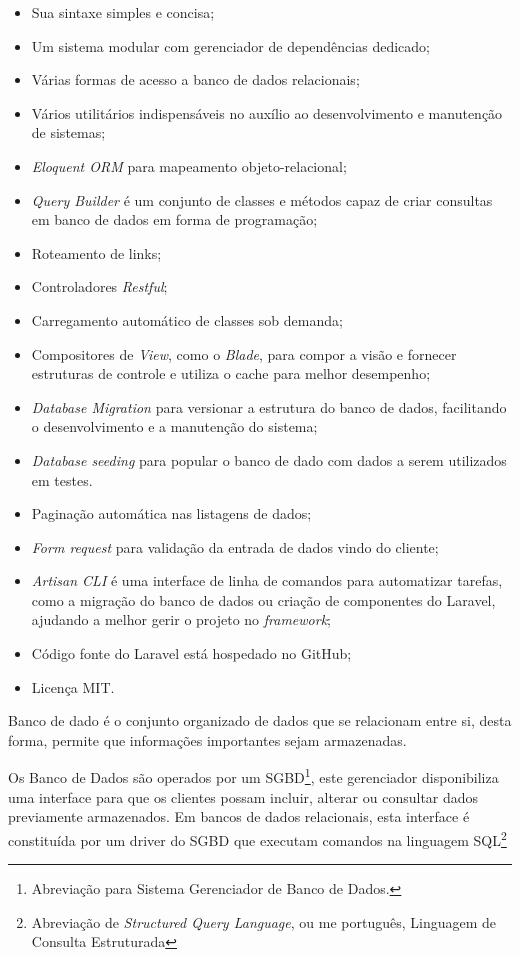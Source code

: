 \documentclass[
  12pt,				%
  openany,
  oneside,
  a4paper,			%
  english,			%
  brazil
]{article}
\numberwithin{figure}{section}
\numberwithin{table}{section}
\newcounter{subsubsubsection}[subsubsection]
\begin{document}
{\singlespacing
\begin{itemize}
  \item Sua sintaxe simples e concisa;
  \item Um sistema modular com gerenciador de dependências dedicado;
  \item Várias formas de acesso a banco de dados relacionais;
  \item Vários utilitários indispensáveis no auxílio ao desenvolvimento e manutenção de sistemas;
  \item \textit{Eloquent ORM} para mapeamento objeto-relacional;
  \item \textit{Query Builder} é um conjunto de classes e métodos capaz de criar consultas em banco de dados em forma de programação;
  \item Roteamento de links;
  \item Controladores \textit{Restful};
  \item Carregamento automático de classes sob demanda;
  \item Compositores de \textit{View}, como o \textit{Blade}, para compor a visão e fornecer estruturas de controle e utiliza o cache para melhor desempenho;
  \item \textit{Database Migration} para versionar a estrutura do banco de dados, facilitando o desenvolvimento e a manutenção do sistema;
  \item \textit{Database seeding} para popular o banco de dado com dados a serem utilizados em testes.
  \item Paginação automática nas listagens de dados;
  \item \textit{Form request} para validação da entrada de dados vindo do cliente;
  \item \textit{Artisan CLI} é uma interface de linha de comandos para automatizar tarefas, como a migração do banco de dados ou criação de componentes do Laravel, ajudando a melhor gerir o projeto no \textit{framework};
  \item Código fonte do Laravel está hospedado no GitHub;
  \item Licença MIT.
\end{itemize}
}


Banco de dado é o conjunto organizado de dados que se relacionam entre si, desta forma, permite que informações importantes sejam armazenadas.

Os Banco de Dados são operados por um SGBD\footnote{Abreviação para Sistema Gerenciador de Banco de Dados.}, este gerenciador disponibiliza uma interface para que os clientes possam incluir, alterar ou consultar dados previamente armazenados. Em bancos de dados relacionais, esta interface é constituída por um driver do SGBD que executam comandos na linguagem SQL\footnote{Abreviação de \textit{Structured Query Language}, ou me português, Linguagem de Consulta Estruturada}
\end{document}
